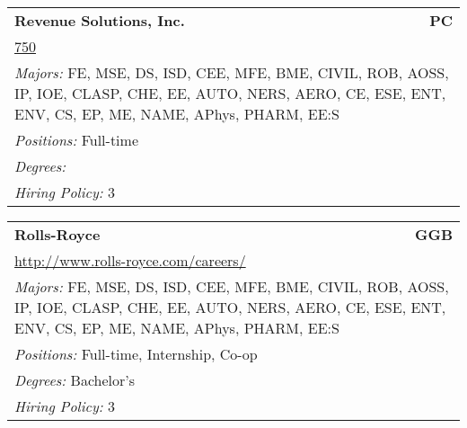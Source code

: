 \documentclass[twoside]{article}
\begin{document}
\begin{center}
\begin{multicols}{3}
\begin{FlushLeft}
\begin{minipage}{\columnwidth}
\end{minipage}
 
\begin{minipage}{\columnwidth}\begin{tabularx}{.95\columnwidth}{Xr}
                 {\Large\bf Revenue Solutions, Inc.} & {\Large\bf PC}\\
    \multicolumn{2}{p{.95\columnwidth}}{\url{750}}\\
    \multicolumn{2}{p{.95\columnwidth}}{\emph{Majors:} FE, MSE, DS, ISD, CEE, MFE, BME, CIVIL, ROB, AOSS, IP, IOE, CLASP, CHE, EE, AUTO, NERS, AERO, CE, ESE, ENT, ENV, CS, EP, ME, NAME, APhys, PHARM, EE:S}\\
    \multicolumn{2}{p{.95\columnwidth}}{\emph{Positions:} Full-time}\\
    \multicolumn{2}{p{.95\columnwidth}}{\emph{Degrees:} }\\
    \multicolumn{2}{p{.95\columnwidth}}{\emph{Hiring Policy:} 3}\\
    \end{tabularx}
    
\end{minipage}
 
\begin{minipage}{\columnwidth}\begin{tabularx}{.95\columnwidth}{Xr}
                 {\Large\bf Rolls-Royce} & {\Large\bf GGB}\\
    \multicolumn{2}{p{.95\columnwidth}}{\url{http://www.rolls-royce.com/careers/}}\\
    \multicolumn{2}{p{.95\columnwidth}}{\emph{Majors:} FE, MSE, DS, ISD, CEE, MFE, BME, CIVIL, ROB, AOSS, IP, IOE, CLASP, CHE, EE, AUTO, NERS, AERO, CE, ESE, ENT, ENV, CS, EP, ME, NAME, APhys, PHARM, EE:S}\\
    \multicolumn{2}{p{.95\columnwidth}}{\emph{Positions:} Full-time, Internship, Co-op}\\
    \multicolumn{2}{p{.95\columnwidth}}{\emph{Degrees:} Bachelor's}\\
    \multicolumn{2}{p{.95\columnwidth}}{\emph{Hiring Policy:} 3}\\
    \end{tabularx}
    
\end{minipage}
 

\end{FlushLeft}
\end{multicols}
\end{center}
\end{document}
